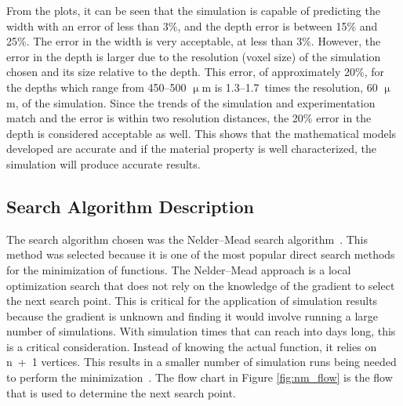 \documentclass[metals,article,accept,pdftex,moreauthors]{Definitions/mdpi}
\begin{document}
From the plots, it can be seen that the simulation is capable of predicting the width with an 
error of less than 3\%, and the depth error is between 15\% and 25\%.  The error in the 
width is very acceptable, at less than 3\%.
However, the error in the depth is larger due to the resolution (voxel size) of the 
simulation chosen and its size relative to the depth.  This error, of approximately 20\%, for 
the depths which range from 450--500 $\upmu$m is \mbox{1.3--1.7}~times the resolution, 
60 $\upmu$m, of the simulation.  Since the trends of the simulation and experimentation 
match and the error is within two resolution distances, the 20\% error in the depth is 
considered acceptable as well. 
This shows that the mathematical models developed are accurate and if the material property is well characterized, the simulation will produce accurate results.


\subsection{Search Algorithm Description}
\label{algrothim_description}

The search algorithm chosen was the Nelder--Mead search algorithm~\cite{nelder_1965}.  
This method was selected because it is one of the most popular direct search methods for 
the minimization of functions.  The Nelder--Mead approach is a local optimization search 
that does not rely on the knowledge of the gradient to select the next search point.  This is 
critical for the application of simulation results because the gradient is unknown and 
finding it would involve running a large number of simulations.  With simulation times 
that can reach into days long, this is a critical consideration.  
Instead of knowing the actual function, it relies on n~+~1 vertices.  This results in a smaller number of simulation runs being needed to perform the minimization~\cite{wang_2011}.
The flow chart in Figure \ref{fig:nm_flow} is the flow that is used to determine the next search point.
\end{document}

